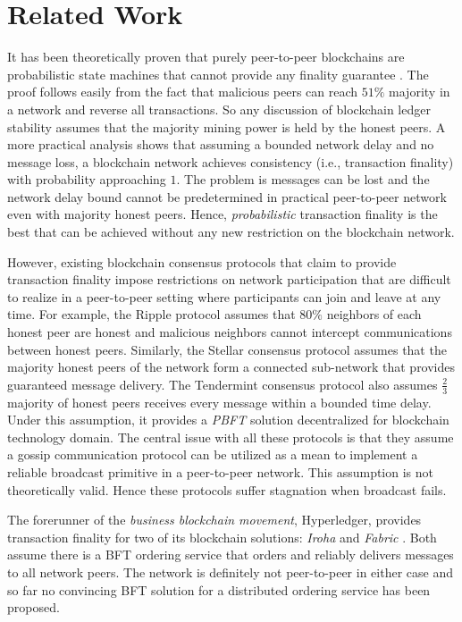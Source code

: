 \section{Related Work}
\label{s-related-work}
It has been theoretically proven that purely peer-to-peer blockchains are probabilistic state machines that cannot provide any finality guarantee \cite{7756226}. The proof follows easily from the fact that malicious peers can reach $51\%$ majority in a network and reverse all transactions. So any discussion of blockchain ledger stability assumes that the majority mining power is held by the honest peers. A more practical analysis \cite{10.1007/978-3-319-56614-6_22} shows that assuming a bounded network delay and no message loss, a blockchain network achieves consistency (i.e., transaction finality) with probability approaching $1$. The problem is messages can be lost and the network delay bound cannot be predetermined in practical peer-to-peer network even with majority honest peers. Hence, \textit{probabilistic} transaction finality is the best that can be achieved without any new restriction on the blockchain network.

However, existing blockchain consensus protocols that claim to provide transaction finality impose restrictions on network participation that are difficult to realize in a peer-to-peer setting where participants can join and leave at any time. For example, the Ripple \cite{David2014TheRP} protocol assumes that $80\%$ neighbors of each honest peer are honest and malicious neighbors cannot intercept communications between honest peers. Similarly, the Stellar consensus protocol \cite{thestellar} assumes that the majority honest peers of the network form a connected sub-network that provides guaranteed message delivery. The Tendermint consensus protocol \cite{Buchman2018TheLG} also assumes $\frac{2}{3}$ majority of honest peers receives every message within a bounded time delay. Under this assumption, it provides a \textit{PBFT} \cite{Castro:1999:PBF:296806.296824} solution decentralized for blockchain technology domain. The central issue with all these protocols is that they assume a gossip communication protocol \cite{gossip} can be utilized as a mean to implement a reliable broadcast primitive \cite{Jalote:1994:FTD:179250} in a peer-to-peer network. This assumption is not theoretically valid. Hence these protocols suffer stagnation when broadcast fails.          

The forerunner of the \textit{business blockchain movement}, Hyperledger, provides transaction finality for two of its blockchain solutions: \textit{Iroha} \cite{yac} and \textit{Fabric} \cite{patent:20180150799}. Both assume there is a BFT ordering service that orders and reliably delivers messages to all network peers. The network is definitely not peer-to-peer in either case and so far no convincing BFT solution for a distributed ordering service has been proposed. 

